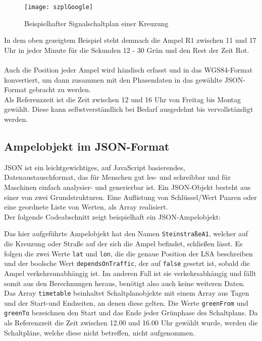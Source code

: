 \begin{figure}[H]
\centering
	\texttt{[image: szplGoogle]}
	\grayRule
	\caption[Signalplan]{Beispielhafter Signalschaltplan einer Kreuzung}
	\label{fig:plan}	
\end{figure}
In dem oben gezeigtem Beispiel steht demnach die Ampel R1 zwischen 11 und 17 Uhr in jeder Minute für die Sekunden 12 - 30 Grün und den Rest der Zeit Rot.\\\\
Auch die Position jeder Ampel wird händisch erfasst und in das WGS84-Format konvertiert, um dann zusammen mit den Phasendaten in das gewählte \gls{JSON}-Format gebracht zu werden.\\
Als Referenzzeit ist die Zeit zwischen 12 und 16 Uhr von Freitag bis Montag gewählt. Diese kann selbstverständlich bei Bedarf ausgedehnt bis vervollständigt werden.
%
%
\subsection[Ampelobjekt im JSON-Format]{Ampelobjekt im \gls{JSON}-Format}
\gls{JSON} ist ein leichtgewichtiges, auf JavaScript basierendes, Datenaustauschformat, das für Menschen gut les- und schreibbar und für Maschinen einfach analysier- und generierbar ist. Ein \gls{JSON}-Objekt besteht aus einer von zwei Grundstrukturen. Eine Auflistung von Schlüssel/Wert Paaren oder eine geordnete Liste von Werten, als Array realisiert. \cite{json}\\ 
Der folgende Codeabschnitt zeigt beispielhaft ein \gls{JSON}-Ampelobjekt:  
\begin{center}
\grayRule

\grayRule
\end{center}
Das hier aufgeführte Ampelobjekt hat den Namen \texttt{SteinstraßeA1}, welcher auf die Kreuzung oder Straße auf der sich die Ampel befindet, schließen lässt. Es folgen die zwei Werte \texttt{lat} und \texttt{lon}, die die genaue Position der \gls{LSA} beschreiben und der boolsche Wert \texttt{dependsOnTraffic}, der auf \texttt{false} gesetzt ist, sobald die Ampel verkehrsunabhängig ist. Im anderen Fall ist sie verkehrsabhängig und fällt somit aus den Berechnungen heraus, benötigt also auch keine weiteren Daten. Das Array \texttt{timetable} beinhaltet Schaltplanobjekte mit einem Array aus Tagen und der Start-und Endzeiten, an denen diese gelten. Die Werte \texttt{greenFrom} und \texttt{greenTo} bezeichnen den Start und das Ende jeder Grünphase des Schaltplans. Da als Referenzzeit die Zeit zwischen 12.00 und 16.00 Uhr gewählt wurde, werden die Schaltpläne, welche diese nicht betreffen, nicht aufgenommen.
